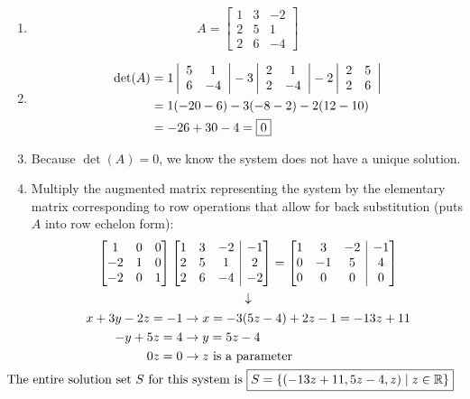 \documentclass[]{article}
\makeatletter
\newenvironment{augmx}[1]{%
	\left[\begin{array}{@{}*{#1}{c}|c@{}}
	}{%
	\end{array}\right]
}
\newcommand{\reals}{\mathbb{R}}
\newcommand{\bmat}[1]{\begin{bmatrix}#1\end{bmatrix}}
\newcommand{\detmat}[1]{
	\left|\hspace{0.5em}
	\begin{matrix}
		#1
	\end{matrix}
	\hspace{0.5em}\right|
}
\makeatother
\begin{document}
	\begin{enumerate}[label=\alph*)]
		\item \[ A = \bmat{1&3&-2\\2&5&1\\2&6&-4} \]
		\item \begin{align*} 
			\det(A) &= 1\detmat{5&1\\6&-4} - 3\detmat{2&1\\2&-4} - 2 \detmat{2&5\\2&6}\\
			&= 1(-20 - 6) - 3(-8-2) - 2(12-10)\\
			&= -26+30-4 = \boxed{0}
		\end{align*}
		\item Because $\det(A) = 0$, we know the system does not have a unique solution.
		\item Multiply the augmented matrix representing the system by the elementary matrix corresponding to row operations that allow for back substitution (puts $A$ into row echelon form):
		\begin{gather*}
		\begin{aligned}
			\bmat{1&0&0\\-2&1&0\\-2&0&1} \begin{augmx}{3}
				1&3&-2&-1\\2&5&1&2\\2&6&-4&-2
			\end{augmx} = \begin{augmx}{3}
				1&3&-2&-1\\0&-1&5&4\\0&0&0&0
			\end{augmx}
		\end{aligned}\\
		\downarrow \\
		\begin{aligned}
			x + 3y - 2z = -1 &\rightarrow x = -3(5z - 4) + 2z - 1 = -13z + 11 \\
			-y + 5z = 4 &\rightarrow y = 5z - 4 \\
			0z = 0 &\rightarrow \text{$z$ is a parameter}
		\end{aligned}\\
		\hspace{-1cm}\text{The entire solution set $S$ for this system is } \boxed {S = \{(-13z + 11, 5z-4, z) \; | \; z \in \reals\} }
		\end{gather*}
	\end{enumerate}
\end{document}
